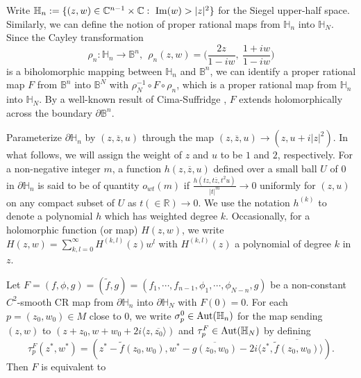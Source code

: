 \documentclass[12pt]{article}
\def\h{\hbox}
\numberwithin{equation}{section}
\def\p{\partial}
\def\BB{{\mathbb B}}
\def\RR{{\mathbb R}}
\def\CC{{\mathbb C}}
\def\HH{{\mathbb H}}
\def\o{\omega}
\def\h{\hbox}
\def\o{\omega}
\def\h{\hbox}
\begin{document}
  Write $\HH_n:=\{(z,w)\in {\CC}^{n-1}\times {\CC}:
  \ \hbox{Im}(w)>|z|^2\}$ for the Siegel upper-half space.
  Similarly, we can define the notion of  proper rational maps from ${\HH}_n$ into
  ${\HH}_N$.
  Since the Cayley transformation
\begin{equation}
\rho_n: {\HH}_n\to {\BB}^n, \ \ \rho_n(z,w)=\bigg(\frac{2z}{1-iw},\
\frac{1+iw}{1-iw}\bigg) \label{eqn:rho}
\end{equation}
is a biholomorphic mapping between $\HH_n$ and ${\BB}^n$,
  we can identify a proper rational map $F$ from ${\BB}^n$ into ${\BB}^N$
  with
$\rho^{-1}_N\circ F\circ\rho_n$, which is a proper rational map from
${\HH}_n$ into ${\HH}_N$.
 By a well-known result of Cima-Suffridge \cite{CS2}, $F$ extends holomorphically across
 the boundary $\p {\BB}^n$.

Parameterize $\partial \HH_n$ by $(z,\overline{z},u)$ through the
map $(z,\overline{z},u)\to (z,u+i|z|^2)$. In what follows, we will
assign the weight of $z$ and $u$ to be  $1$ and $2$, respectively.
For a non-negative integer $m$, a function $h(z,\overline{z},u)$
defined over a small ball  $U$ of $0$ in $\partial \HH_n$  is said
to be of quantity $o_{wt}(m)$ if
$\frac{h(tz,t\overline{z},t^2u)}{|t|^{m}}\to 0$ uniformly for
$(z,u)$ on any
  compact subset of $U$ as $t(\in {\RR})\to 0$.
We use the notation $h^{(k)}$ to denote a polynomial $h$ which has
  weighted degree $k$. Occasionally, for a holomorphic function (or
  map) $H(z,w)$, we write $H(z,w)=\sum_{k,l=0}^{\infty}H^{(k,l)}(z)w^l$
  with  $H^{(k,l)}(z)$ a polynomial of degree $k$ in $z$.
\bigskip

Let $F=(f,\phi,g)=(\widetilde{f}, g)= (f_1,\cdots,f_{n-1},
\phi_1,\cdots, \phi_{N-n},g)$ be a non-constant $C^2$-smooth CR map
from $\partial{\HH}_n$ into $\partial{\HH}_N$ with $F(0)=0$. For
each $p=(z_0, w_0)\in M$ close to $0$, we write $\sigma^0_p\in
\hbox{Aut}(\HH_n)$ for the map sending $(z,w)$ to $(z+z_0, w+w_0+2i
\langle z,\overline{z_0} \rangle )$ and
$\tau^F_p\in\hbox{Aut}(\HH_N)$ by defining
$$\tau^F_p(z^*,w^*)=(z^*-\widetilde{f}(z_0,w_0),w^*-\overline{g(z_0,w_0)}-
2i \langle z^*,\overline{\widetilde{f}(z_0,w_0)} \rangle ).$$
  Then $F$ is
equivalent to
\end{document}
